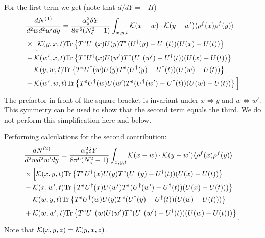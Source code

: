 \documentclass[aps,prd,amsmath,amssymb,nofootinbib]{revtex4-2}
\numberwithin{equation}{section}
\begin{document}
For the first term we get (note that $d/dY = - H$)
\begin{align}
    &\frac{dN^{(1)}}{d^2 w d^2 w' d y} = \frac{\alpha_s^2 \delta Y}{8 \pi^6 (N_c^2-1)}
\int_{x,y,t} {\cal K}(x-w)\cdot {\cal K}(y-w') \langle\rho^f(x) \rho^f(y) \rangle \notag \\ & \times  
\Big[ 
 {\cal K}(y,x,t) {\rm Tr} \left\{ T^e U^\dagger(x) U(y) T^e ( U^\dagger(y) - U^\dagger(t) )  ( U(x) - U(t) )\right\}
 \notag \\ & -  {\cal K}(w',x,t) {\rm Tr} \left\{ T^e U^\dagger(x) U(w') T^e ( U^\dagger(w') - U^\dagger(t) )  ( U(x) - U(t) )\right\}
 \notag \\ & -  {\cal K}(y,w,t) {\rm Tr} \left\{ T^e U^\dagger(w) U(y) T^e ( U^\dagger(y) - U^\dagger(t) )  ( U(w) - U(t) )\right\}
 \notag \\ & +  {\cal K}(w',w,t) {\rm Tr} \left\{ T^e U^\dagger(w) U(w') T^e ( U^\dagger(w') - U^\dagger(t) )  ( U(w) - U(t) )\right\}
\Big] 
\end{align}
The prefactor in front of the square bracket is invariant under $ x \Leftrightarrow y $ and $ w \Leftrightarrow w' $.  This symmetry can be used to show that the second term equals the third. We do not perform this simplification here and below. 

Performing calculations for the second contribution: 
\begin{align}
    &\frac{dN^{(2)}}{d^2 w d^2 w' d y} = \frac{\alpha_s^2 \delta Y}{8 \pi^6 (N_c^2-1)}
\int_{x,y,t} {\cal K}(x-w)\cdot {\cal K}(y-w') \langle\rho^f(x) \rho^f(y) \rangle \notag \\ & \times  
\Big[ 
 {\cal K}(x,y,t) {\rm Tr} \left\{ T^e U^\dagger(x) U(y) T^e ( U^\dagger(y) - U^\dagger(t) )  ( U(x) - U(t) )\right\}
 \notag \\ & -  {\cal K}(x, w',t) {\rm Tr} \left\{ T^e U^\dagger(x) U(w') T^e ( U^\dagger(w') - U^\dagger(t) )  ( U(x) - U(t) ))\right\}
 \notag \\ & -  {\cal K}(w,y,t) {\rm Tr} \left\{ T^e U^\dagger(w) U(y) T^e ( U^\dagger(y) - U^\dagger(t) )  ( U(w) - U(t) ) )\right\}
 \notag \\ & +  {\cal K}(w, w',t) {\rm Tr} \left\{ T^e U^\dagger(w) U(w') T^e ( U^\dagger(w') - U^\dagger(t) )  ( U(w) - U(t) ) )\right\}
\Big] 
\end{align} 
Note that ${\cal K}(x,y,z) = {\cal K}(y,x,z)$. 
\end{document}
